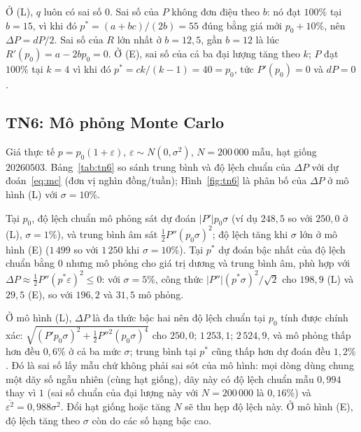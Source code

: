Ở (L), $q$ luôn có sai số $0$. Sai số của $P$ không đơn điệu theo $b$: nó đạt $100\%$ tại $b=15$, vì khi
đó $p^*=(a+bc)/(2b)=55$ đúng bằng giá mới $p_0+10\%$, nên $\Delta P=dP/2$. Sai số của $R$ lớn nhất ở
$b=12{,}5$, gần $b=12$ là lúc $R'(p_0)=a-2bp_0=0$. Ở (E), sai số của cả ba đại lượng tăng theo $k$;
$P$ đạt $100\%$ tại $k=4$ vì khi đó $p^*=ck/(k-1)=40=p_0$, tức $P'(p_0)=0$ và $dP=0$.

\subsection{TN6: Mô phỏng Monte Carlo}
Giá thực tế $p=p_0(1+\varepsilon)$, $\varepsilon\sim N(0,\sigma^2)$, $N=200\,000$ mẫu, hạt giống
$20260503$. Bảng~\ref{tab:tn6} so sánh trung bình và độ lệch chuẩn của $\Delta P$ với
dự đoán~\eqref{eq:mc} (đơn vị nghìn đồng/tuần); Hình~\ref{fig:tn6} là phân bố của $\Delta P$ ở mô hình (L)
với $\sigma=10\%$.

\begin{table}[ht]
\tbsty
\caption{Monte Carlo: $\Delta P$ thực và dự đoán từ khai triển Taylor.}\label{tab:tn6}
{\setlength{\tabcolsep}{5pt}}
\end{table}

Tại $p_0$, độ lệch chuẩn mô phỏng sát dự đoán $|P'|p_0\sigma$ (ví dụ $248{,}5$ so với $250{,}0$ ở (L),
$\sigma=1\%$), và trung bình âm sát $\tfrac12P''(p_0\sigma)^2$; độ lệch tăng khi $\sigma$ lớn ở mô
hình (E) ($1\,499$ so với $1\,250$ khi $\sigma=10\%$). Tại $p^*$ dự đoán bậc nhất của độ lệch chuẩn
bằng $0$ nhưng mô phỏng cho giá trị dương và trung bình âm, phù hợp với $\Delta P\approx\tfrac12P''(p^*\varepsilon)^2\le0$:
với $\sigma=5\%$, công thức $|P''|(p^*\sigma)^2/\sqrt2$ cho $198{,}9$ (L) và $29{,}5$ (E), so với $196{,}2$ và
$31{,}5$ mô phỏng.

Ở mô hình (L), $\Delta P$ là đa thức bậc hai nên độ lệch chuẩn tại $p_0$ tính được chính xác: $\sqrt{(P'p_0\sigma)^2+\tfrac12P''^2(p_0\sigma)^4}$ cho $250{,}0$; $1\,253{,}1$; $2\,524{,}9$, và mô phỏng thấp hơn đều $0{,}6\%$ ở cả ba mức $\sigma$; trung bình tại $p^*$ cũng thấp hơn dự đoán đều $1{,}2\%$. Đó là sai số lấy mẫu chứ không phải sai sót của mô hình: mọi dòng dùng chung một dãy số ngẫu nhiên (cùng hạt giống), dãy này có độ lệch chuẩn mẫu $0{,}994$ thay vì $1$ (sai số chuẩn của đại lượng này với $N=200\,000$ là $0{,}16\%$) và $\overline{\varepsilon^2}=0{,}988\sigma^2$. Đổi hạt giống hoặc tăng $N$ sẽ thu hẹp độ lệch này. Ở mô hình (E), độ lệch tăng theo $\sigma$ còn do các số hạng bậc cao.

